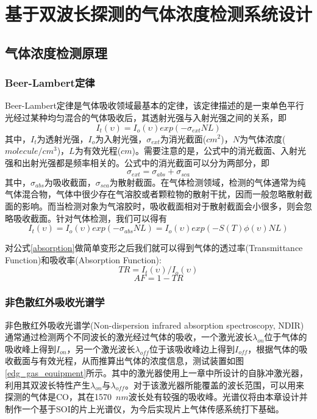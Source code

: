 \chapter{基于双波长探测的气体浓度检测系统设计}

\section{气体浓度检测原理}

\subsection{Beer-Lambert定律}
Beer-Lambert定律是气体吸收领域最基本的定律，该定律描述的是一束单色平行光经过某种均匀混合的气体吸收后，其透射光强与入射光强之间的关系，即
\begin{equation}
\label{beer_lambert}
I_{t}(\upsilon) = I_{o}(\upsilon)exp(-\sigma_{ext}NL)
\end{equation}
其中，$I_{t}$为透射光强，$I_{o}$为入射光强，$\sigma_{ext}$为消光截面($cm^{2}$)，$N$为气体浓度($molecule/cm^3$)，$L$为有效光程($cm$)。需要注意的是，公式中的消光截面、入射光强和出射光强都是频率相关的。公式中的消光截面可以分为两部分，即
\begin{equation}
\label{extinction}
\sigma_{ext} = \sigma_{abs} + \sigma_{sca}
\end{equation}
其中，$\sigma_{abs}$为吸收截面，$\sigma_{sca}$为散射截面。在气体检测领域，检测的气体通常为纯气体混合物，气体中很少存在气溶胶或者颗粒物的散射干扰，因而一般忽略散射截面的影响。而当检测对象为气溶胶时，吸收截面相对于散射截面会小很多，则会忽略吸收截面。针对气体检测，我们可以得有
\begin{equation}
\label{absorption}
I_{t}(\upsilon) = I_{o}(\upsilon)exp(-\sigma_{abs}NL) = I_{o}(\upsilon)exp(-S(T)\phi(\upsilon)NL)
\end{equation}

对公式\ref{absorption}做简单变形之后我们就可以得到气体的透过率(Transmittance Function)和吸收率(Absorption Function):
\begin{equation}
\label{transmittance_fuction}
TR = I_t(\upsilon)/I_o(\upsilon)
\end{equation}
\begin{equation}
\label{absorption_fuction}
AF = 1 - TR
\end{equation}

\subsection{非色散红外吸收光谱学}
非色散红外吸收光谱学(Non-dispersion infrared absorption spectroscopy, NDIR)通常通过检测两个不同波长的激光经过气体的吸收，一个激光波长$\lambda_{on}$位于气体的吸收峰上得到$I_{on}$，另一个激光波长$\lambda_{off}$位于该吸收峰边上得到$I_{off}$，根据气体的吸收截面与有效光程，从而推算出气体的浓度信息，测试装置如图\ref{edg_gas_equipment}所示。其中的激光器使用上一章中所设计的自脉冲激光器，利用其双波长特性产生$\lambda_{on}$与$\lambda_{off}$。对于该激光器所能覆盖的波长范围，可以用来探测的气体是CO，其在1570~$nm$波长处有较强的吸收峰。光谱仪将由本章设计并制作一个基于SOI的片上光谱仪，为今后实现片上气体传感系统打下基础。

